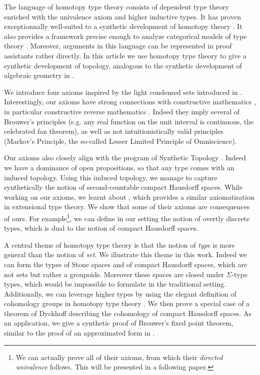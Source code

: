 The language of homotopy type theory consists of dependent type theory enriched with the univalence axiom and higher inductive types. It has proven exceptionnally well-suited to
a synthetic development of homotopy theory \cite{hott}. It also provides
a framework precise enough to analyze categorical models of type theory \cite{vanderweide2024}.
Moreover, arguments in this language can be represented in proof assistants rather directly. In this article we use homotopy type theory to give a synthetic development of topology, analogous to the synthetic development of algebraic geometry in \cite{draft}. 

We introduce four axioms inspired by the light condensed sets introduced in \cite{Scholze}.
Interestingly, our axioms have strong connections with constructive mathematics \cite{Bishop},
in particular constructive reverse mathematics \cite{ReverseMathsBishop,HannesDiener}. Indeed they imply several of Brouwer's principles (e.g. any real function on the unit interval is continuous, the celebrated fan theorem), as well as not intuitionistically valid principles (Markov's Principle, the so-called Lesser Limited Principle of Omniscience).

Our axioms also closely align with the program of Synthetic Topology \cite{SyntheticTopologyEscardo,SyntheticTopologyLesnik,abstractstone,faissole2017synthetic,vickers2007locales}.
Indeed we have a dominance of open propositions, so that any type comes with an induced topology. Using this induced topology, we manage to capture synthetically the notion of second-countable compact Hausdorff spaces. While working on our axioms, we learnt about \cite{bc24}, which provides a similar axiomatisation in extensional type theory. We show that some of their axioms are consequences of ours. For example\footnote{We can actually prove all of their axioms, from which their \emph{directed univalence} follows. This will be presented in a following paper.}, we can define in our setting the notion of overtly discrete types, which is dual to the notion of compact Hausdorff spaces.

A central theme of homotopy type theory is that the notion of {\em type} is more general than the notion of {\em set}. We illustrate this theme in this work. Indeed we can form the types of Stone spaces and of compact Hausdorff spaces, which are not sets but rather a groupoids. Moreover these spaces are closed under $\Sigma$-type types, which would be impossible to formulate in the traditional setting.
Additionally, we can leverage higher types by using the elegant definition of cohomology groups in homotopy type theory \cite{hott}. We then prove a special case of a theorem of Dyckhoff \cite{dyckhoff76} describing
the cohomology of compact Hausdorff spaces. As an application, we give a synthetic proof of Brouwer's fixed point theorem, similar to the proof of an approximated form in \cite{shulman-Brouwer-fixed-point}.

